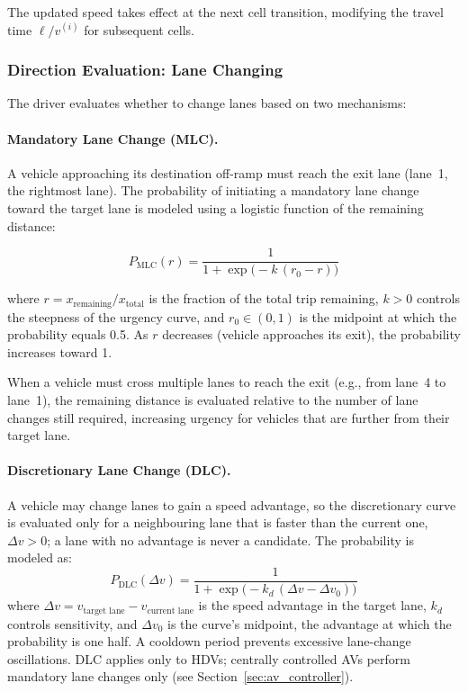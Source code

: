 \documentclass[review,number]{elsarticle}
\begin{document}
The updated speed takes effect at the next cell transition, modifying the travel time $\ell / v^{(i)}$ for subsequent cells.

\subsubsection{Direction Evaluation: Lane Changing}
\label{sec:lane_changing}

The driver evaluates whether to change lanes based on two mechanisms:

\paragraph{Mandatory Lane Change (MLC).}
A vehicle approaching its destination off-ramp must reach the exit lane (lane~1, the rightmost lane). The probability of initiating a mandatory lane change toward the target lane is modeled using a logistic function of the remaining distance:

\begin{equation}
    P_{\text{MLC}}(r) = \frac{1}{1 + \exp\!\big(-k\,(r_0 - r)\big)}
    \label{eq:mlc_logistic}
\end{equation}

where $r = x_{\text{remaining}} / x_{\text{total}}$ is the fraction of the total trip remaining, $k > 0$ controls the steepness of the urgency curve, and $r_0 \in (0, 1)$ is the midpoint at which the probability equals 0.5. As $r$ decreases (vehicle approaches its exit), the probability increases toward 1.

When a vehicle must cross multiple lanes to reach the exit (e.g., from lane~4 to lane~1), the remaining distance is evaluated relative to the number of lane changes still required, increasing urgency for vehicles that are further from their target lane.

\paragraph{Discretionary Lane Change (DLC).}
A vehicle may change lanes to gain a speed advantage, so the discretionary curve is evaluated only for a neighbouring lane that is faster than the current one, $\Delta v > 0$; a lane with no advantage is never a candidate. The probability is modeled as:
\begin{equation}
    P_{\text{DLC}}(\Delta v) = \frac{1}{1 + \exp\!\big(-k_d\,(\Delta v - \Delta v_0)\big)}
    \label{eq:dlc_logistic}
\end{equation}
where $\Delta v = v_{\text{target lane}} - v_{\text{current lane}}$ is the speed advantage in the target lane, $k_d$ controls sensitivity, and $\Delta v_0$ is the curve's midpoint, the advantage at which the probability is one half. A cooldown period prevents excessive lane-change oscillations. DLC applies only to HDVs; centrally controlled AVs perform mandatory lane changes only (see Section~\ref{sec:av_controller}).
\end{document}
